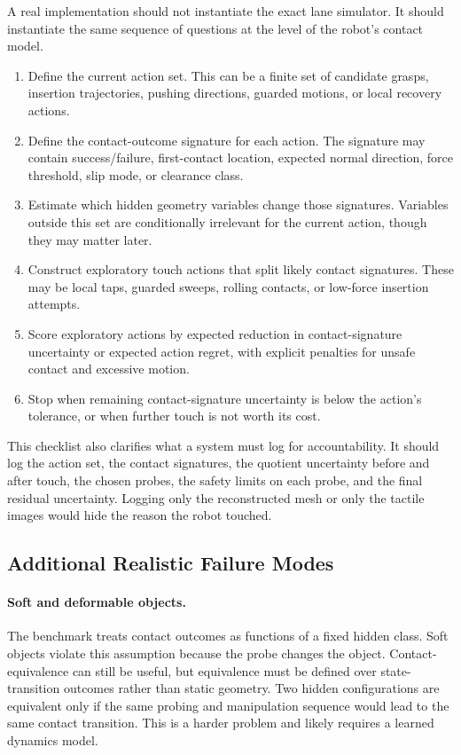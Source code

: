 \documentclass{article}
\begin{document}
A real implementation should not instantiate the exact lane simulator. It should instantiate the same sequence of questions at the level of the robot's contact model.

\begin{enumerate}
    \item Define the current action set. This can be a finite set of candidate grasps, insertion trajectories, pushing directions, guarded motions, or local recovery actions.
    \item Define the contact-outcome signature for each action. The signature may contain success/failure, first-contact location, expected normal direction, force threshold, slip mode, or clearance class.
    \item Estimate which hidden geometry variables change those signatures. Variables outside this set are conditionally irrelevant for the current action, though they may matter later.
    \item Construct exploratory touch actions that split likely contact signatures. These may be local taps, guarded sweeps, rolling contacts, or low-force insertion attempts.
    \item Score exploratory actions by expected reduction in contact-signature uncertainty or expected action regret, with explicit penalties for unsafe contact and excessive motion.
    \item Stop when remaining contact-signature uncertainty is below the action's tolerance, or when further touch is not worth its cost.
\end{enumerate}

This checklist also clarifies what a system must log for accountability. It should log the action set, the contact signatures, the quotient uncertainty before and after touch, the chosen probes, the safety limits on each probe, and the final residual uncertainty. Logging only the reconstructed mesh or only the tactile images would hide the reason the robot touched.

\subsection{Additional Realistic Failure Modes}

\paragraph{Soft and deformable objects.}
The benchmark treats contact outcomes as functions of a fixed hidden class. Soft objects violate this assumption because the probe changes the object. Contact-equivalence can still be useful, but equivalence must be defined over state-transition outcomes rather than static geometry. Two hidden configurations are equivalent only if the same probing and manipulation sequence would lead to the same contact transition. This is a harder problem and likely requires a learned dynamics model.
\end{document}
